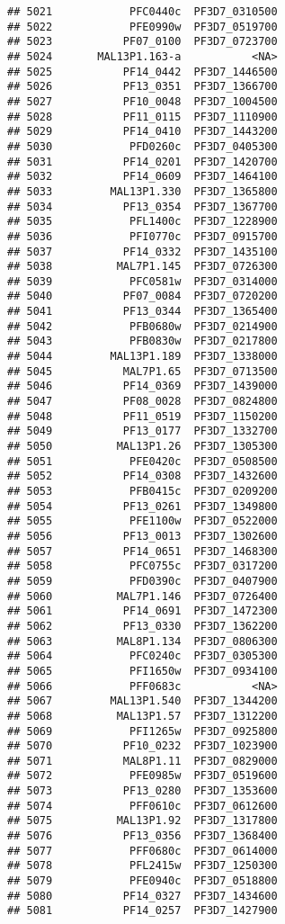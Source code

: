 \documentclass{article}\usepackage[]{graphicx}\usepackage[]{color}
\makeatletter
\newenvironment{kframe}{%
 \def\at@end@of@kframe{}%
 \ifinner\ifhmode%
  \def\at@end@of@kframe{\end{minipage}}%
  \begin{minipage}{\columnwidth}%
 \fi\fi%
 \def\FrameCommand##1{\hskip\@totalleftmargin \hskip-\fboxsep
 \colorbox{shadecolor}{##1}\hskip-\fboxsep
     \hskip-\linewidth \hskip-\@totalleftmargin \hskip\columnwidth}%
 \MakeFramed {\advance\hsize-\width
   \@totalleftmargin\z@ \linewidth\hsize
   \@setminipage}}%
 {\par\unskip\endMakeFramed%
 \at@end@of@kframe}
\newenvironment{knitrout}{}{} %
\makeatother
\begin{document}
\begin{knitrout}
\begin{kframe}
\begin{verbatim}
## 5021            PFC0440c  PF3D7_0310500
## 5022            PFE0990w  PF3D7_0519700
## 5023           PF07_0100  PF3D7_0723700
## 5024       MAL13P1.163-a           <NA>
## 5025           PF14_0442  PF3D7_1446500
## 5026           PF13_0351  PF3D7_1366700
## 5027           PF10_0048  PF3D7_1004500
## 5028           PF11_0115  PF3D7_1110900
## 5029           PF14_0410  PF3D7_1443200
## 5030            PFD0260c  PF3D7_0405300
## 5031           PF14_0201  PF3D7_1420700
## 5032           PF14_0609  PF3D7_1464100
## 5033         MAL13P1.330  PF3D7_1365800
## 5034           PF13_0354  PF3D7_1367700
## 5035            PFL1400c  PF3D7_1228900
## 5036            PFI0770c  PF3D7_0915700
## 5037           PF14_0332  PF3D7_1435100
## 5038          MAL7P1.145  PF3D7_0726300
## 5039            PFC0581w  PF3D7_0314000
## 5040           PF07_0084  PF3D7_0720200
## 5041           PF13_0344  PF3D7_1365400
## 5042            PFB0680w  PF3D7_0214900
## 5043            PFB0830w  PF3D7_0217800
## 5044         MAL13P1.189  PF3D7_1338000
## 5045           MAL7P1.65  PF3D7_0713500
## 5046           PF14_0369  PF3D7_1439000
## 5047           PF08_0028  PF3D7_0824800
## 5048           PF11_0519  PF3D7_1150200
## 5049           PF13_0177  PF3D7_1332700
## 5050          MAL13P1.26  PF3D7_1305300
## 5051            PFE0420c  PF3D7_0508500
## 5052           PF14_0308  PF3D7_1432600
## 5053            PFB0415c  PF3D7_0209200
## 5054           PF13_0261  PF3D7_1349800
## 5055            PFE1100w  PF3D7_0522000
## 5056           PF13_0013  PF3D7_1302600
## 5057           PF14_0651  PF3D7_1468300
## 5058            PFC0755c  PF3D7_0317200
## 5059            PFD0390c  PF3D7_0407900
## 5060          MAL7P1.146  PF3D7_0726400
## 5061           PF14_0691  PF3D7_1472300
## 5062           PF13_0330  PF3D7_1362200
## 5063          MAL8P1.134  PF3D7_0806300
## 5064            PFC0240c  PF3D7_0305300
## 5065            PFI1650w  PF3D7_0934100
## 5066            PFF0683c           <NA>
## 5067         MAL13P1.540  PF3D7_1344200
## 5068          MAL13P1.57  PF3D7_1312200
## 5069            PFI1265w  PF3D7_0925800
## 5070           PF10_0232  PF3D7_1023900
## 5071           MAL8P1.11  PF3D7_0829000
## 5072            PFE0985w  PF3D7_0519600
## 5073           PF13_0280  PF3D7_1353600
## 5074            PFF0610c  PF3D7_0612600
## 5075          MAL13P1.92  PF3D7_1317800
## 5076           PF13_0356  PF3D7_1368400
## 5077            PFF0680c  PF3D7_0614000
## 5078            PFL2415w  PF3D7_1250300
## 5079            PFE0940c  PF3D7_0518800
## 5080           PF14_0327  PF3D7_1434600
## 5081           PF14_0257  PF3D7_1427900

\end{verbatim}
\end{kframe}
\end{knitrout}
\end{document}
